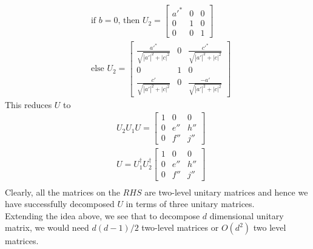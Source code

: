 \begin{equation}
\begin{split}
&\text{if $b = 0$, then } U_2  =  \left[ {\begin{array}{ccc} 
   a'^* & 0 & 0\\
   0 & 1 & 0\\
    0 & 0 & 1
  \end{array} } \right]
  \\&\text{else } U_2 =  \left[ {\begin{array}{ccc}
   \frac{a'^*}{\sqrt{|a'|^2 + |c|^2}} & 0 & \frac{c'^*}{\sqrt{|a'|^2 + |c|^2}}\\
   0 & 1 & 0\\
    \frac{c'}{\sqrt{|a'|^2 + |c|^2}} & 0 & \frac{-a'}{\sqrt{|a'|^2 + |c|^2}}
  \end{array} } \right]
\end{split}
\end{equation}This reduces $U$ to
\begin{equation}
\begin{split}
&U_2U_1U = \left[ {\begin{array}{ccc} 
   1 & 0 & 0\\
   0 &  e'' & h''\\
    0 & f'' & j''
  \end{array} } \right]\\
&U = U_1^\dagger U_2^\dagger\left[ {\begin{array}{ccc} 
   1 & 0 & 0\\
   0 &  e'' & h''\\
    0 & f'' & j''
    \end{array} } \right]\\
\end{split}
\end{equation}Clearly, all the matrices on the $RHS$ are two-level unitary matrices and hence we have successfully decomposed $U$ in terms of three unitary matrices. \\
Extending the idea above, we see that to decompose $d$ dimensional unitary matrix, we would need $d(d-1)/2$ two-level matrices or $O(d^2)$ two level matrices.\\
